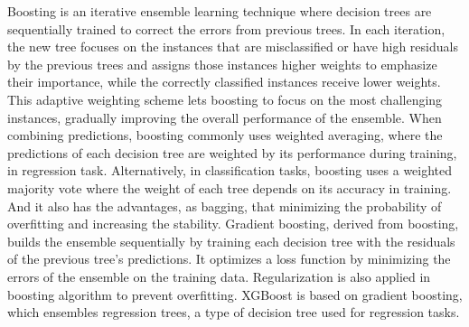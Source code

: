 \documentclass[12pt,a4paper,english
]{tunithesis}
\begin{document}
Boosting is an iterative ensemble learning technique where decision trees are sequentially trained to correct the errors from previous trees. In each iteration, the new tree focuses on the instances that are misclassified or have high residuals by the previous trees and assigns those instances higher weights to emphasize their importance, while the correctly classified instances receive lower weights. This adaptive weighting scheme lets boosting to focus on the most challenging instances, gradually improving the overall performance of the ensemble. When combining predictions, boosting commonly uses weighted averaging, where the predictions of each decision tree are weighted by its performance during training, in regression task. Alternatively, in classification tasks, boosting uses a weighted majority vote where the weight of each tree depends on its accuracy in training. And it also has the advantages, as bagging, that minimizing the probability of overfitting and increasing the stability. Gradient boosting, derived from boosting, builds the ensemble sequentially by training each decision tree with the residuals of the previous tree's predictions. It optimizes a loss function by minimizing the errors of the ensemble on the training data. Regularization is also applied in boosting algorithm to prevent overfitting. XGBoost is based on gradient boosting, which ensembles regression trees, a type of decision tree used for regression tasks.
\end{document}

